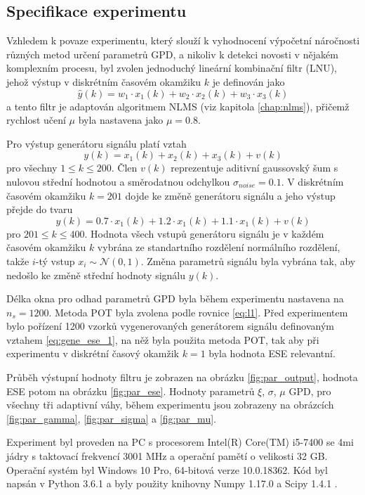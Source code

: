 \subsection{Specifikace experimentu}
Vzhledem k povaze experimentu, který slouží k vyhodnocení výpočetní náročnosti různých metod určení parametrů GPD, a nikoliv k detekci novosti v nějakém komplexním procesu, byl zvolen jednoduchý lineární kombinační filtr (LNU), jehož výstup v diskrétním časovém okamžiku $k$ je definován jako
\begin{equation}\label{eq:gene_ese_1}
\hat{y}(k)=w_1\cdot x_1(k)+w_2\cdot x_2(k)+w_3\cdot x_3(k)
\end{equation}
a tento filtr je adaptován algoritmem NLMS (viz kapitola \ref{chap:nlms}), přičemž rychlost učení $\mu$ byla nastavena jako $\mu=0.8$.
\par 
Pro výstup generátoru signálu platí vztah
\begin{equation}
y(k)=x_1(k)+x_2(k)+x_3(k)+v(k)
\end{equation}
pro všechny $1 \leq k \leq 200$. Člen $v(k)$ reprezentuje aditivní gaussovský šum s nulovou střední hodnotou a směrodatnou odchylkou $\sigma_{noise}=0.1$. V diskrétním časovém okamžiku $k=201$ dojde ke změně generátoru signálu a jeho výstup přejde do tvaru
\begin{equation}
y(k)=0.7\cdot x_1(k)+1.2\cdot x_1(k)+1.1 \cdot x_1(k) + v(k)
\end{equation}
pro $201 \leq k \leq 400$. Hodnota všech vstupů generátoru signálu je v každém časovém okamžiku $k$ vybrána ze standartního rozdělení normálního rozdělení, takže $i$-tý vstup $x_i\sim \mathcal{N}(0,1)$. Změna parametrů signálu byla vybrána tak, aby nedošlo ke změně střední hodnoty signálu $y(k)$.
\par
Délka okna pro odhad parametrů GPD byla během experimentu nastavena na $n_s=1200$. Metoda POT byla zvolena podle rovnice \ref{eq:l1}. Před experimentem bylo pořízení 1200 vzorků vygenerovaných generátorem signálu definovaným vztahem \ref{eq:gene_ese_1}, na něž byla použita metoda POT, tak aby při experimentu v diskrétní časový okamžik $k=1$ byla hodnota ESE relevantní.
\par
Průběh výstupní hodnoty filtru je zobrazen na obrázku \ref{fig:par_output}, hodnota ESE potom na obrázku \ref{fig:par_ese}. Hodnoty parametrů $\xi$, $\sigma$, $\mu$ GPD, pro všechny tři adaptivní váhy, během experimentu jsou zobrazeny na obrázcích \ref{fig:par_gamma}, \ref{fig:par_sigma} a \ref{fig:par_mu}.
\par
Experiment byl proveden na PC s procesorem Intel(R) Core(TM) i5-7400 se 4mi jádry s taktovací frekvencí 3001 MHz a operační pamětí o velikosti 32 GB. Operační systém byl Windows 10 Pro, 64-bitová verze 10.0.18362. Kód byl napsán v Python 3.6.1 \cite{python} a byly použity knihovny Numpy 1.17.0 \cite{numpy} a Scipy 1.4.1 \cite{scipy}.



